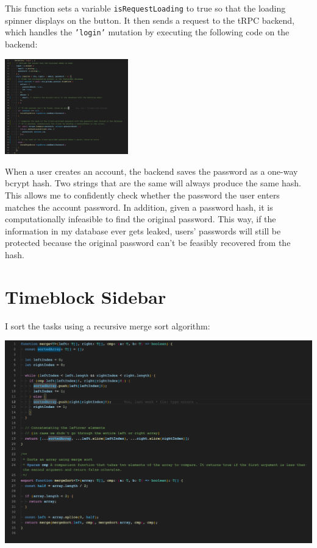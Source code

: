 \documentclass[notitlepage, 12pt]{report}
\newcommand{\code}[1]{\texttt{#1}}
\begin{document}
This function sets a variable \code{isRequestLoading} to true so that the loading spinner displays on the button. It then sends a request to the tRPC backend, which handles the \code{'login'} mutation by executing the following code on the backend:

\includegraphics[width=0.4\textwidth]{backend-login-function.png}

When a user creates an account, the backend saves the password as a one-way bcrypt hash. Two strings that are the same will always produce the same hash. This allows me to confidently check whether the password the user enters matches the account password. In addition, given a password hash, it is computationally infeasible to find the original password. This way, if the information in my database ever gets leaked, users' passwords will still be protected because the original password can't be feasibly recovered from the hash.

\section*{Timeblock Sidebar}

I sort the tasks using a recursive merge sort algorithm:

\includegraphics[width=1\textwidth]{merge-sort.png}
\end{document}
